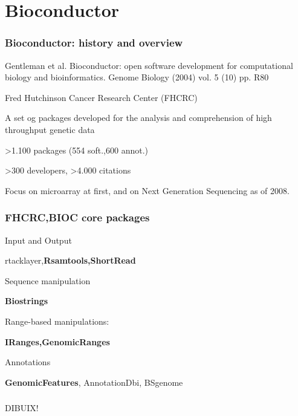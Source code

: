 \documentclass{beamer}
\begin{document}
     
  \section{Bioconductor}
  
  \begin{frame}
     \frametitle{Bioconductor: history and overview}
      \bit
	  \item Gentleman et al. Bioconductor: open software development for computational biology and bioinformatics.
	  Genome Biology (2004) vol. 5 (10) pp. R80
	    \bit
		\item Fred Hutchinson Cancer Research Center (FHCRC)
	    \eit
	   \item A set og packages developed for the analysis and comprehension of high throughput genetic data
	    \bit
		\item >1.100 packages (554 soft.,600 annot.)
		\item >300 developers, >4.000 citations
	    \eit
	   \item Focus on microarray at first, and on Next Generation Sequencing as of 2008.
      \eit
     \end{frame}
     
     
  
     \begin{frame}
     \frametitle{FHCRC,BIOC core packages}
      \bit
	  \item Input and Output
	    \bit
		\item rtacklayer,\textbf{Rsamtools,ShortRead}
	    \eit
	  \item Sequence manipulation
	    \bit
		\item \textbf{Biostrings}
	    \eit
	  \item Range-based manipulations:
	    \bit
		\item \textbf{IRanges,GenomicRanges}
	    \eit
	  \item Annotations
	    \bit
		\item \textbf{GenomicFeatures}, AnnotationDbi, BSgenome
	    \eit
      \eit
     \end{frame}
     
       \begin{frame}
     \frametitle{}
      \bit
	  \item DIBUIX!
      \eit
     \end{frame}
     
       
     
\end{document}
